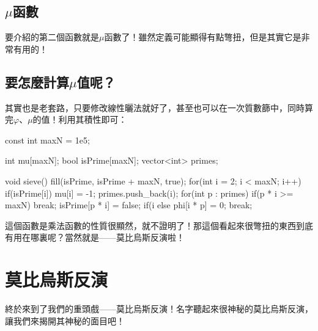	\subsection{$\mu$函數}
		要介紹的第二個函數就是$\mu$函數了！雖然定義可能顯得有點彆扭，但是其實它是非常有用的！
	\subsection{要怎麼計算$\mu$值呢？}
		其實也是老套路，只要修改線性曬法就好了，甚至也可以在一次質數篩中，同時算完$\varphi$、$\mu$的值！利用其積性即可：
		\begin{C++}
const int maxN = 1e5;

int mu[maxN];
bool isPrime[maxN];
vector<int> primes;

void sieve(){
	fill(isPrime, isPrime + maxN, true);
	for(int i = 2; i < maxN; i++){
		if(isPrime[i]){
			mu[i] = -1;
			primes.push_back(i);
		}
		for(int p : primes){
			if(p * i >= maxN) break;
			isPrime[p * i] = false;
			if(i %
			else {
				phi[i * p] = 0;
				break;
			}
		}
	}
}
		\end{C++}
		這個函數是乘法函數的性質很顯然，就不證明了！那這個看起來很彆扭的東西到底有用在哪裏呢？當然就是——莫比烏斯反演啦！


\section{莫比烏斯反演}
	終於來到了我們的重頭戲——莫比烏斯反演！名字聽起來很神秘的莫比烏斯反演，讓我們來揭開其神秘的面目吧！
